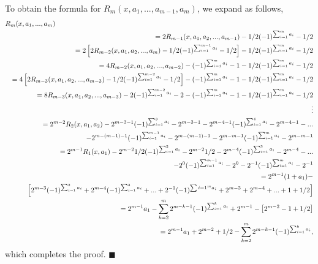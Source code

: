 {To obtain the formula for $R_m(x,a_1,...,a_{m-1},a_m)$, we expand as
follows,
\begin{eqnarray*}
\lefteqn{R_m(x,a_1,...,a_m)}  \\
& & =  2R_{m-1}(x,a_1,a_2,...,a_{m-1})-1/2(-1)^{\sum_{i=1}^ma_i}-1/2\\
& & =  2\left[2R_{m-2}(x,a_1,a_2,...,a_m)-1/2(-1)^{\sum_{i=1}^{m-1}a_i}-1/2\right]-1/2(-1)^{\sum_{i=1}^ma_i}-1/2\\
              &  & =  4R_{m-2}(x,a_1,a_2,...,a_{m-2})-(-1)^{\sum_{i=1}^m a_i}-1-1/2(-1)^{\sum_{i=1}^ma_i}-1/2\\
                       &  & =  4\left[2R_{m-3}(x,a_1,a_2,...,a_{m-3})-1/2(-1)^{\sum_{i=1}^{m-2} a_i}-1/2\right]-(-1)^{\sum_{i=1}^m a_i}-1-1/2(-1)^{\sum_{i=1}^ma_i}-1/2\\
                       &  & =  8R_{m-3}(x,a_1,a_2,...,a_{m-3})-2(-1)^{\sum_{i=1}^{m-2}
                       a_i}-2-(-1)^{\sum_{i=1}^m
                       a_i}-1-1/2(-1)^{\sum_{i=1}^ma_i}-1/2\\
                       &  & \vdots\\
                       &  & =  2^{m-2}R_2(x,a_1,a_2)-2^{m-3-1}(-1)^{\sum_{i=1}^3 a_i}-2^{m-3-1}-2^{m-4-1}(-1)^{\sum_{i=1}^4 a_i}-2^{m-4-1}-...\\
                       &  &  \hspace{0.2in}-2^{m-(m-1)-1}(-1)^{\sum_{i=1}^{m-1} a_i}-2^{m-(m-1)-1}-2^{m-m-1}(-1)^{\sum_{i=1}^m a_i}-2^{m-m-1}\\
                       &  & =  2^{m-1}R_1(x,a_1)-2^{m-2}1/2(-1)^{\sum_{i=1}^2 a_i}-2^{m-2}1/2-2^{m-4}(-1)^{\sum_{i=1}^3 a_i}-2^{m-4}-...\\
                       &  &  \hspace{0.2in}-2^0(-1)^{\sum_{i=1}^{m-1} a_i}-2^0-2^{-1}(-1)^{\sum_{i=1}^m a_i}-2^{-1}\\
                       &  & = 2^{m-1}(1+a_1)-\\
                       &  & \left[2^{m-3}(-1)^{\sum_{i=1}^2 a_i}+2^{m-4}(-1)^{\sum_{i=1}^3 a_i}+...+2^{-1}(-1)^{\sum{i=1}^m a_i}+2^{m-3}+2^{m-4}+...+1+1/2 \right]\\
                       &  & = 2^{m-1}a_1-\sum_{k=2}^m 2^{m-k-1}(-1)^{\sum_{i=1}^k
                       a_i}+2^{m-1}-\left[2^{m-2}-1+1/2\right]\\
                       &  & =
                       2^{m-1}a_1+2^{m-2}+1/2-\sum_{k=2}^m2^{m-k-1}(-1)^{\sum_{i=1}^ka_i},
\end{eqnarray*}
which completes the proof. \hfill $\blacksquare$

}
